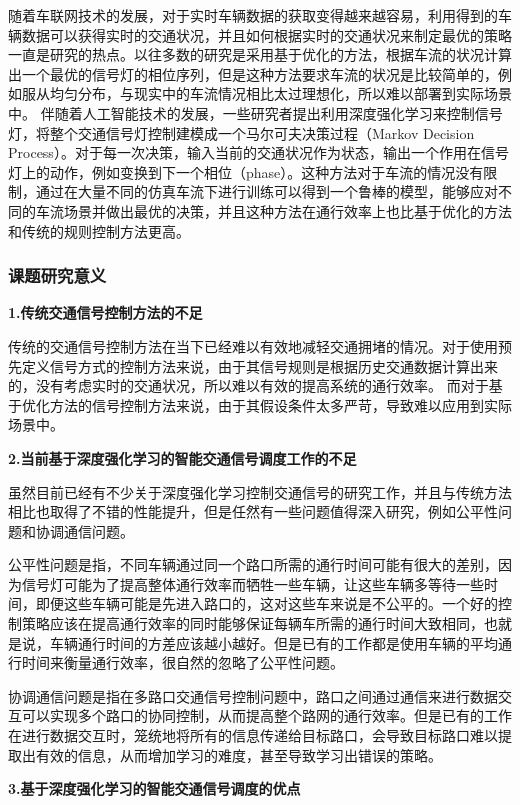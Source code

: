 随着车联网技术的发展，对于实时车辆数据的获取变得越来越容易，利用得到的车辆数据可以获得实时的交通状况，并且如何根据实时的交通状况来制定最优的策略一直是研究的热点。以往多数的研究是采用基于优化的方法，根据车流的状况计算出一个最优的信号灯的相位序列，但是这种方法要求车流的状况是比较简单的，例如服从均匀分布，与现实中的车流情况相比太过理想化，所以难以部署到实际场景中。
伴随着人工智能技术的发展，一些研究者提出利用深度强化学习来控制信号灯，将整个交通信号灯控制建模成一个马尔可夫决策过程（Markov Decision Process）。对于每一次决策，输入当前的交通状况作为状态，输出一个作用在信号灯上的动作，例如变换到下一个相位（phase）。这种方法对于车流的情况没有限制，通过在大量不同的仿真车流下进行训练可以得到一个鲁棒的模型，能够应对不同的车流场景并做出最优的决策，并且这种方法在通行效率上也比基于优化的方法和传统的规则控制方法更高。

\subsubsection{课题研究意义}
\textbf{1.传统交通信号控制方法的不足}

传统的交通信号控制方法在当下已经难以有效地减轻交通拥堵的情况。对于使用预先定义信号方式的控制方法来说，由于其信号规则是根据历史交通数据计算出来的，没有考虑实时的交通状况，所以难以有效的提高系统的通行效率。
而对于基于优化方法的信号控制方法来说，由于其假设条件太多严苛，导致难以应用到实际场景中。

\textbf{2.当前基于深度强化学习的智能交通信号调度工作的不足}

虽然目前已经有不少关于深度强化学习控制交通信号的研究工作，并且与传统方法相比也取得了不错的性能提升，但是任然有一些问题值得深入研究，例如公平性问题和协调通信问题。

公平性问题是指，不同车辆通过同一个路口所需的通行时间可能有很大的差别，因为信号灯可能为了提高整体通行效率而牺牲一些车辆，让这些车辆多等待一些时间，即便这些车辆可能是先进入路口的，这对这些车来说是不公平的。一个好的控制策略应该在提高通行效率的同时能够保证每辆车所需的通行时间大致相同，也就是说，车辆通行时间的方差应该越小越好。但是已有的工作都是使用车辆的平均通行时间来衡量通行效率，很自然的忽略了公平性问题。

协调通信问题是指在多路口交通信号控制问题中，路口之间通过通信来进行数据交互可以实现多个路口的协同控制，从而提高整个路网的通行效率。但是已有的工作在进行数据交互时，笼统地将所有的信息传递给目标路口，会导致目标路口难以提取出有效的信息，从而增加学习的难度，甚至导致学习出错误的策略。

\textbf{3.基于深度强化学习的智能交通信号调度的优点}


